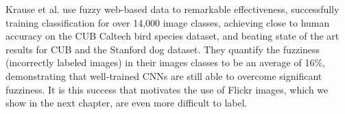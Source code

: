 Krause et al. use fuzzy web-based data to remarkable effectiveness, successfully training classification for over 14,000 image classes, achieving close to human accuracy on the CUB Caltech bird species dataset, and beating state of the art results for CUB and the Stanford dog dataset\cite{krause2016unreasonable}. They quantify the fuzziness (incorrectly labeled images) in their images classes to be an average of 16\%, demonstrating that well-trained CNNs are still able to overcome significant fuzziness. It is this success that motivates the use of Flickr images, which we show in the next chapter, are even more difficult to label.

